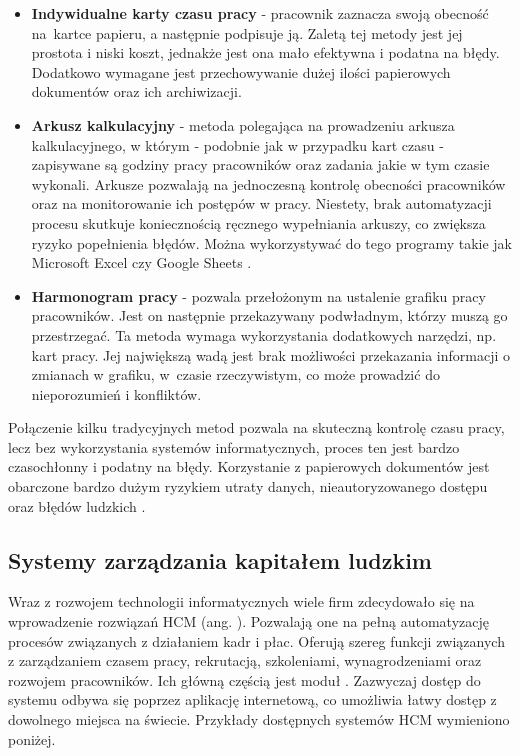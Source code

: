 \begin{itemize}
    \item \textbf{Indywidualne karty czasu pracy} \cite{bib:PotwierdzenieObecnosci} - pracownik zaznacza swoją obecność na~kartce papieru, a następnie podpisuje ją. Zaletą tej metody jest jej prostota i niski koszt, jednakże jest ona mało efektywna i podatna na błędy. Dodatkowo wymagane jest przechowywanie dużej ilości papierowych dokumentów oraz ich archiwizacji.
    \item \textbf{Arkusz kalkulacyjny} - metoda polegająca na prowadzeniu arkusza kalkulacyjnego, w którym - podobnie jak w przypadku kart czasu - zapisywane są godziny pracy pracowników oraz zadania jakie w tym czasie wykonali. Arkusze pozwalają na jednoczesną kontrolę obecności pracowników oraz na monitorowanie ich postępów w pracy. Niestety, brak automatyzacji procesu skutkuje koniecznością ręcznego wypełniania arkuszy, co zwiększa ryzyko popełnienia błędów. Można wykorzystywać do tego programy takie jak Microsoft Excel czy Google Sheets \cite{bib:ExcelTimeTracking}.
    \item \textbf{Harmonogram pracy} - pozwala przełożonym na ustalenie grafiku pracy pracowników. Jest on następnie przekazywany podwładnym, którzy muszą go przestrzegać. Ta metoda wymaga wykorzystania dodatkowych narzędzi, np. kart pracy. Jej największą wadą jest brak możliwości przekazania informacji o zmianach w grafiku, w~czasie rzeczywistym, co może prowadzić do nieporozumień i konfliktów.
\end{itemize}

Połączenie kilku tradycyjnych metod pozwala na skuteczną kontrolę czasu pracy, lecz bez wykorzystania systemów informatycznych, proces ten jest bardzo czasochłonny i podatny na błędy. Korzystanie z papierowych dokumentów jest obarczone bardzo dużym ryzykiem utraty danych, nieautoryzowanego dostępu oraz błędów ludzkich \cite{bib:LuceosSmart}.

\subsection{Systemy zarządzania kapitałem ludzkim}

Wraz z rozwojem technologii informatycznych wiele firm zdecydowało się na wprowadzenie rozwiązań HCM (ang. ). Pozwalają one na pełną automatyzację procesów związanych z działaniem kadr i płac. Oferują szereg funkcji związanych z zarządzaniem czasem pracy, rekrutacją, szkoleniami, wynagrodzeniami oraz rozwojem pracowników. Ich główną częścią jest moduł  \cite{bib:OracleHCMWhatIs}. Zazwyczaj dostęp do systemu odbywa się poprzez aplikację internetową, co umożliwia łatwy dostęp z dowolnego miejsca na świecie. Przykłady dostępnych systemów HCM wymieniono poniżej.

